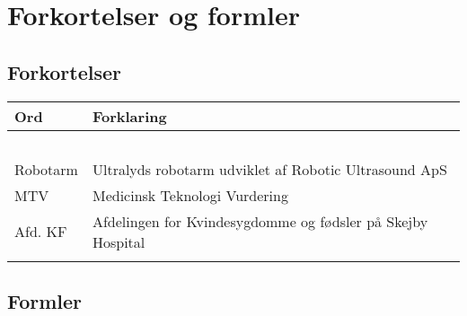 \chapter{Forkortelser og formler}

\section{Forkortelser}
\begin{longtabu} to 
    Ord &    Forklaring\\
    \toprule\ \\
    Robotarm & Ultralyds robotarm udviklet af Robotic Ultrasound ApS \\
    MTV & Medicinsk Teknologi Vurdering \\
  	Afd. KF & Afdelingen for Kvindesygdomme og fødsler på Skejby Hospital \\
   
\label{forkort}
\end{longtabu}

\section{Formler}